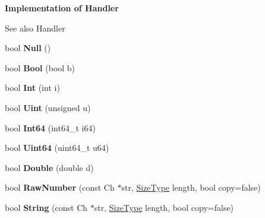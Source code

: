 \begin{Indent}{\bf Implementation of Handler}\par
{\em \begin{DoxySeeAlso}{See also}
Handler 
\end{DoxySeeAlso}
}\begin{DoxyCompactItemize}
\item 
bool {\bfseries Null} ()\hypertarget{classPrettyWriter_aa144f2d0f0c3c69248cdbe957349528c}{}\label{classPrettyWriter_aa144f2d0f0c3c69248cdbe957349528c}

\item 
bool {\bfseries Bool} (bool b)\hypertarget{classPrettyWriter_a6e765ee7ada5ed40f317c78a98f6f90b}{}\label{classPrettyWriter_a6e765ee7ada5ed40f317c78a98f6f90b}

\item 
bool {\bfseries Int} (int i)\hypertarget{classPrettyWriter_aa1815263e61cb7af3b6dfba480a0f481}{}\label{classPrettyWriter_aa1815263e61cb7af3b6dfba480a0f481}

\item 
bool {\bfseries Uint} (unsigned u)\hypertarget{classPrettyWriter_a8c82302877a5588eae77eb7d042c49ef}{}\label{classPrettyWriter_a8c82302877a5588eae77eb7d042c49ef}

\item 
bool {\bfseries Int64} (int64\+\_\+t i64)\hypertarget{classPrettyWriter_ad42b797429f4ee19efdce610f5aff976}{}\label{classPrettyWriter_ad42b797429f4ee19efdce610f5aff976}

\item 
bool {\bfseries Uint64} (uint64\+\_\+t u64)\hypertarget{classPrettyWriter_aba75ac1f13c2629b2a55ffbf3d8a116c}{}\label{classPrettyWriter_aba75ac1f13c2629b2a55ffbf3d8a116c}

\item 
bool {\bfseries Double} (double d)\hypertarget{classPrettyWriter_ad9d592e86b985da666665926e87db415}{}\label{classPrettyWriter_ad9d592e86b985da666665926e87db415}

\item 
bool {\bfseries Raw\+Number} (const Ch $\ast$str, \hyperlink{rapidjson_8h_a5ed6e6e67250fadbd041127e6386dcb5}{Size\+Type} length, bool copy=false)\hypertarget{classPrettyWriter_a3941bc21d6a261ca8a86eff330db30ef}{}\label{classPrettyWriter_a3941bc21d6a261ca8a86eff330db30ef}

\item 
bool {\bfseries String} (const Ch $\ast$str, \hyperlink{rapidjson_8h_a5ed6e6e67250fadbd041127e6386dcb5}{Size\+Type} length, bool copy=false)\hypertarget{classPrettyWriter_ae544ccfe35dd7e80ed694873062409f6}{}\label{classPrettyWriter_ae544ccfe35dd7e80ed694873062409f6}


\end{DoxyCompactItemize}
\end{Indent}
